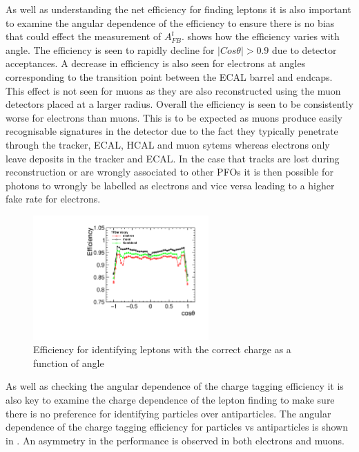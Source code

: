 As well as understanding the net efficiency for finding leptons it is also important to examine the angular dependence of the efficiency to ensure there is no bias that could effect the measurement of $A_{FB}^{t}$.  shows how the efficiency varies with angle. The efficiency is seen to rapidly decline for $|Cos\theta| > 0.9$ due to detector acceptances. A decrease in efficiency is also seen for electrons at angles corresponding to the transition point between the ECAL barrel and endcaps. This effect is not seen for muons as they are also reconstructed using the muon detectors placed at a larger radius. Overall the efficiency is seen to be consistently worse for electrons than muons. This is to be expected as muons produce easily recognisable signatures in the detector due to the fact they typically penetrate through the tracker, ECAL, HCAL and muon sytems whereas electrons only leave deposits in the tracker and ECAL. In the case that tracks are lost during reconstruction or are wrongly associated to other PFOs it is then possible for photons to wrongly be labelled as electrons and vice versa leading to a higher fake rate for electrons.

\begin{figure}
  \centering
  \includegraphics[width=0.6\textwidth]{TopAnalysis/figures/NetEfficiencys.pdf}
  \caption[Charge Tagging Efficiency]{Efficiency for identifying leptons with the correct charge as a function of angle}
  \label{fig:netefficiency}
\end{figure}

As well as checking the angular dependence of the charge tagging efficiency it is also key to examine the charge dependence of the lepton finding to make sure there is no preference for identifying particles over antiparticles. The angular dependence of the charge tagging efficiency for particles vs antiparticles is shown in . An asymmetry in the performance is observed in both electrons and muons.

